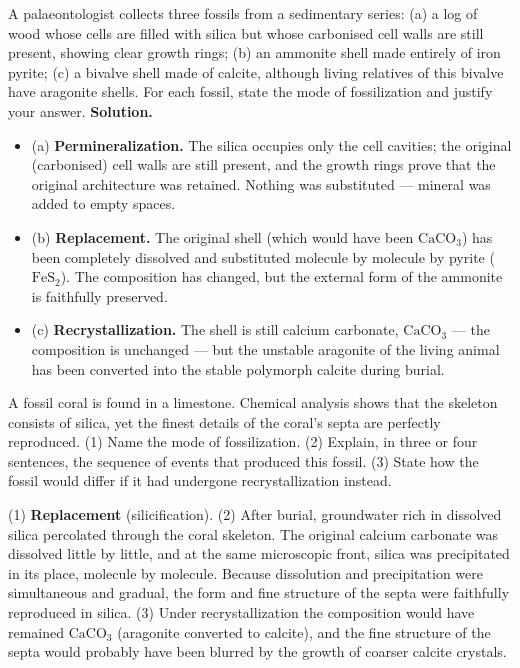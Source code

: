 \documentclass[11pt]{article}
\begin{document}
\begin{exoresolu}
A palaeontologist collects three fossils from a sedimentary series: (a) a log of wood whose cells are filled with silica but whose carbonised cell walls are still present, showing clear growth rings; (b) an ammonite shell made entirely of iron pyrite; (c) a bivalve shell made of calcite, although living relatives of this bivalve have aragonite shells. For each fossil, state the mode of fossilization and justify your answer.
\tcblower
\textbf{Solution.}
\begin{itemize}
\item (a) \textbf{Permineralization.} The silica occupies only the cell cavities; the original (carbonised) cell walls are still present, and the growth rings prove that the original architecture was retained. Nothing was substituted --- mineral was added to empty spaces.
\item (b) \textbf{Replacement.} The original shell (which would have been $\mathrm{CaCO_3}$) has been completely dissolved and substituted molecule by molecule by pyrite ($\mathrm{FeS_2}$). The composition has changed, but the external form of the ammonite is faithfully preserved.
\item (c) \textbf{Recrystallization.} The shell is still calcium carbonate, $\mathrm{CaCO_3}$ --- the composition is unchanged --- but the unstable aragonite of the living animal has been converted into the stable polymorph calcite during burial.
\end{itemize}
\end{exoresolu}

\begin{exercice}
A fossil coral is found in a limestone. Chemical analysis shows that the skeleton consists of silica, yet the finest details of the coral's septa are perfectly reproduced. (1) Name the mode of fossilization. (2) Explain, in three or four sentences, the sequence of events that produced this fossil. (3) State how the fossil would differ if it had undergone recrystallization instead.
\end{exercice}

\begin{corrige}[Exercise 1]
(1) \textbf{Replacement} (silicification). (2) After burial, groundwater rich in dissolved silica percolated through the coral skeleton. The original calcium carbonate was dissolved little by little, and at the same microscopic front, silica was precipitated in its place, molecule by molecule. Because dissolution and precipitation were simultaneous and gradual, the form and fine structure of the septa were faithfully reproduced in silica. (3) Under recrystallization the composition would have remained $\mathrm{CaCO_3}$ (aragonite converted to calcite), and the fine structure of the septa would probably have been blurred by the growth of coarser calcite crystals.
\end{corrige}
\end{document}
